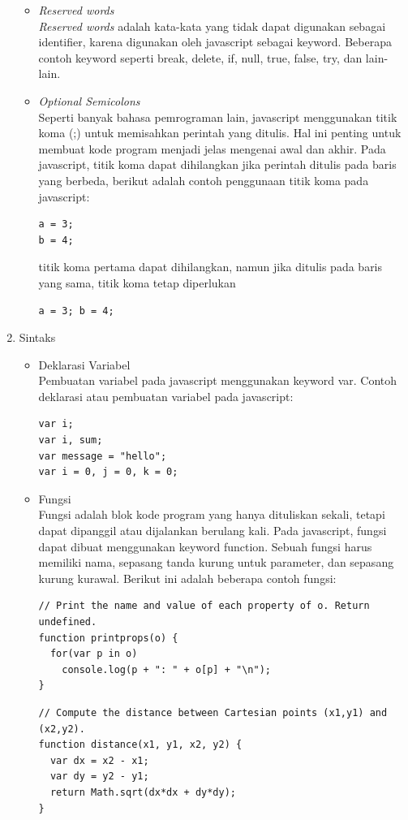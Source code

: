 \begin{enumerate}
\begin{itemize}
\item \textit{Reserved words} \\
\textit{Reserved words} adalah kata-kata yang tidak dapat digunakan sebagai
identifier, karena digunakan oleh javascript sebagai keyword. Beberapa contoh keyword seperti break, delete, if, 
null, true, false, try, dan lain-lain.

\item \textit{Optional Semicolons} \\
Seperti banyak bahasa pemrograman lain, javascript menggunakan titik koma (;) untuk memisahkan perintah 
yang ditulis. Hal ini penting untuk membuat kode program menjadi jelas mengenai awal dan akhir. Pada 
javascript, titik koma dapat dihilangkan jika perintah ditulis pada baris yang berbeda, berikut adalah 
contoh penggunaan titik koma pada javascript:
\begin{verbatim}
a = 3;
b = 4;
\end{verbatim}
titik koma pertama dapat dihilangkan, namun jika ditulis pada baris yang sama, titik koma tetap diperlukan
\begin{verbatim}
a = 3; b = 4;
\end{verbatim}
\end{itemize}

\item Sintaks
\begin{itemize}
\item Deklarasi Variabel \\
Pembuatan variabel pada javascript menggunakan keyword var. Contoh deklarasi atau pembuatan variabel pada javascript:
\begin{verbatim}
var i;
var i, sum;
var message = "hello";
var i = 0, j = 0, k = 0;
\end{verbatim}

\item Fungsi \\
Fungsi adalah blok kode program yang hanya dituliskan sekali, tetapi dapat
dipanggil atau dijalankan berulang kali. Pada javascript, fungsi dapat dibuat menggunakan keyword function. 
Sebuah fungsi harus memiliki nama, sepasang tanda kurung untuk parameter, dan sepasang kurung kurawal. 
Berikut ini adalah beberapa contoh fungsi:
\begin{verbatim}
// Print the name and value of each property of o. Return undefined.
function printprops(o) {
  for(var p in o)
    console.log(p + ": " + o[p] + "\n");
}
\end{verbatim}
\begin{verbatim}
// Compute the distance between Cartesian points (x1,y1) and (x2,y2).
function distance(x1, y1, x2, y2) {
  var dx = x2 - x1;
  var dy = y2 - y1;
  return Math.sqrt(dx*dx + dy*dy);
}
\end{verbatim}


\end{itemize}
\end{enumerate}
